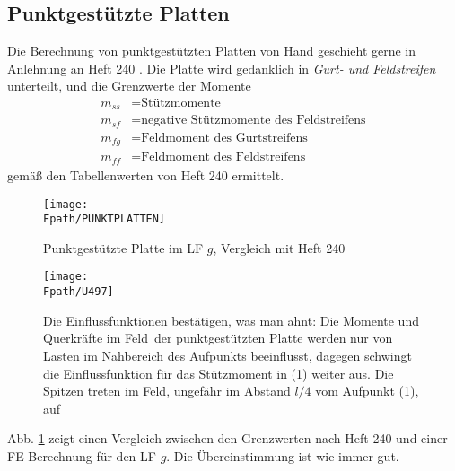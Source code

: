 {\textcolor{sectionTitleBlue}{\section{Punktgest\"{u}tzte Platten}}}
Die Berechnung von punktgest\"{u}tzten Platten von Hand geschieht gerne in Anlehnung an Heft 240 \cite{Grasser}. Die Platte wird gedanklich in {\em Gurt- und Feldstreifen\/} unterteilt, und die Grenzwerte der Momente
\begin{subequations}
\begin{align}
m_{ss} &= \mbox{St\"{u}tzmomente}\\
m_{sf} &= \mbox{negative St\"{u}tzmomente des Feldstreifens}\\
m_{fg} &= \mbox{Feldmoment des Gurtstreifens}\\
m_{ff} &= \mbox{Feldmoment des Feldstreifens}
\end{align}
\end{subequations}
gem\"{a}{\ss} den Tabellenwerten von Heft 240 ermittelt.
\begin{figure}[tbp]
\centering
\if {} \sidecaption \fi
\texttt{[image: \\Fpath/PUNKTPLATTEN]}
\caption{Punktgest\"{u}tzte Platte im LF $g$, Vergleich mit Heft 240} \label{PunktPlatten}
\end{figure}%
\begin{figure}[tbp]
\centering
\if {} \sidecaption \fi
\texttt{[image: \\Fpath/U497]}
\caption{Die Einflussfunktionen best\"{a}tigen, was man ahnt: Die Momente und Querkr\"{a}fte \glq im Feld\grq\ der punktgest\"{u}tzten Platte werden nur von Lasten im Nahbereich des Aufpunkts beeinflusst, dagegen schwingt die Einflussfunktion f\"{u}r das St\"{u}tzmoment in (1) weiter aus. Die Spitzen treten im Feld, ungef\"{a}hr im Abstand $l/4$ vom Aufpunkt (1), auf} \label{U497}
\end{figure}%

Abb. \ref{PunktPlatten} zeigt einen Vergleich zwischen den Grenzwerten nach Heft 240 und einer FE-Berechnung f\"{u}r den LF $g$. Die \"{U}bereinstimmung ist wie immer gut.

